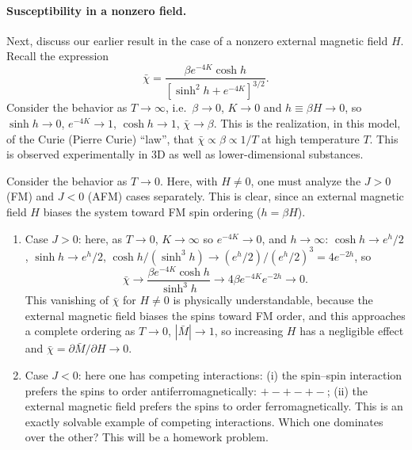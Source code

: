 \paragraph{Susceptibility in a nonzero field.}

Next, discuss our earlier result in the case of a nonzero external magnetic field $H$. Recall the expression
\begin{equation}
  \bar\chi = \frac{\beta e^{-4K}\cosh h}{\left[\sinh^2h+e^{-4K}\right]^{3/2}}.
\end{equation}
Consider the behavior as $T\to\infty$, i.e.\ $\beta\to 0$, $K\to 0$ and $h\equiv\beta H\to 0$, so $\sinh h\to 0$,
$e^{-4K}\to 1$, $\cosh h\to 1$, $\bar\chi\to\beta$. This is the realization, in this model, of the Curie (Pierre Curie)
``law'', that $\bar\chi\propto\beta\propto1/T$ at high temperature $T$. This is observed experimentally in 3D as well as
lower-dimensional substances.

Consider the behavior as $T\to 0$. Here, with $H\ne 0$, one must analyze the $J>0$ (FM) and $J<0$ (AFM) cases separately.
This is clear, since an external magnetic field $H$ biases the system toward FM spin ordering ($h = \beta H$).
\begin{enumerate}[label=(\arabic*)]
  \item Case $J>0$: here, as $T\to 0$, $K\to\infty$ so $e^{-4K}\to 0$, and $h\to\infty$:
    $\cosh h\to e^h/2$, $\sinh h\to e^h/2$, $\cosh h/(\sinh^3h)\to(e^h/2)/(e^h/2)^3 = 4e^{-2h}$, so
    \begin{equation}
      \bar\chi\to\frac{\beta e^{-4K}\cosh h}{\sinh^3h}\to 4\beta e^{-4K}e^{-2h}\to 0 .
    \end{equation}
    This vanishing of $\bar\chi$ for $H\ne 0$ is physically understandable, because the external magnetic field biases the
    spins toward FM order, and this approaches a complete ordering as $T\to 0$, $|\bar M|\to 1$, so increasing $H$ has a
    negligible effect and $\bar\chi = \partial \bar M/\partial H\to 0$.
  \item Case $J<0$: here one has competing interactions: (i) the spin--spin interaction prefers the spins to order
    antiferromagnetically: $+-+-+-$; (ii) the external magnetic field prefers the spins to order ferromagnetically. This is
    an exactly solvable example of competing interactions. Which one dominates over the other? This will be a homework
    problem.
\end{enumerate}
